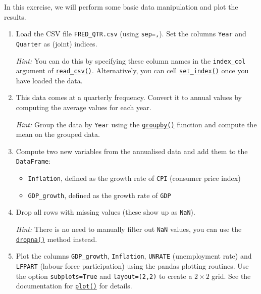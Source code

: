 \documentclass[10pt]{scrartcl}
\providecommand{\tightlist}{%
      \setlength{\itemsep}{0pt}\setlength{\parskip}{0pt}}
\begin{document}
In this exercise, we will perform some basic data manipulation and plot
the results.

\begin{enumerate}
\def\labelenumi{\arabic{enumi}.}
\item
  Load the CSV file \texttt{FRED\_QTR.csv} (using
  \texttt{sep=\textquotesingle{},\textquotesingle{}}). Set the columns
  \texttt{Year} and \texttt{Quarter} as (joint) indices.

  \emph{Hint:} You can do this by specifying these column names in the
  \texttt{index\_col} argument of
  \href{https://pandas.pydata.org/pandas-docs/stable/reference/api/pandas.read_csv.html}{\texttt{read\_csv()}}.
  Alternatively, you can cell
  \href{https://pandas.pydata.org/pandas-docs/stable/reference/api/pandas.DataFrame.set_index.html}{\texttt{set\_index()}}
  once you have loaded the data.
\item
  This data comes at a quarterly frequency. Convert it to annual values
  by computing the average values for each year.

  \emph{Hint:} Group the data by \texttt{Year} using the
  \href{https://pandas.pydata.org/pandas-docs/stable/reference/api/pandas.DataFrame.groupby.html}{\texttt{groupby()}}
  function and compute the mean on the grouped data.
\item
  Compute two new variables from the annualised data and add them to the
  \texttt{DataFrame}:

  \begin{itemize}
  \tightlist
  \item
    \texttt{Inflation}, defined as the growth rate of \texttt{CPI}
    (consumer price index)
  \item
    \texttt{GDP\_growth}, defined as the growth rate of \texttt{GDP}
  \end{itemize}
\item
  Drop all rows with missing values (these show up as \texttt{NaN}).

  \emph{Hint:} There is no need to manually filter out \texttt{NaN}
  values, you can use the
  \href{https://pandas.pydata.org/pandas-docs/stable/reference/api/pandas.DataFrame.dropna.html}{\texttt{dropna()}}
  method instead.
\item
  Plot the columns \texttt{GDP\_growth}, \texttt{Inflation},
  \texttt{UNRATE} (unemployment rate) and \texttt{LFPART} (labour force
  participation) using the pandas plotting routines. Use the option
  \texttt{subplots=True} and \texttt{layout=(2,2)} to create a
  \(2\times2\) grid. See the documentation for
  \href{https://pandas.pydata.org/docs/reference/api/pandas.DataFrame.plot.html\#pandas.DataFrame.plot}{\texttt{plot()}}
  for details.
\end{enumerate}
\end{document}

